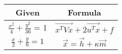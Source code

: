 \begin{tabular}{|c|c|}
\hline
    \textbf{Given} & \textbf{Formula}\\
\hline
    $\frac{x^2}{4} + \frac{y^2}{36}$ = 1 & $\Vec{x^TVx} + 2\Vec{u^Tx} + f$ \\
\hline
    $\frac{x}{2} + \frac{y}{6} = 1$ & $\Vec{x} = \Vec{h} + \kappa\Vec{m}$\\
\hline
\end{tabular}
